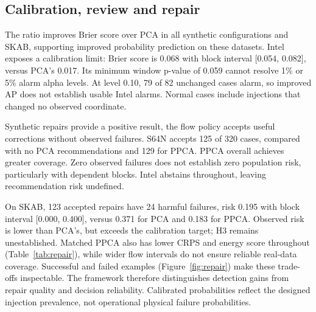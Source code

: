 \documentclass{llncs}
\newcommand{\1}{\mathbf{1}}
\begin{document}
\subsection{Calibration, review and repair}
The ratio improves Brier score over PCA in all synthetic configurations and SKAB, supporting improved probability prediction on these datasets. Intel exposes a calibration limit: Brier score is 0.068 with block interval [0.054, 0.082], versus PCA's 0.017. Its minimum window p-value of 0.059 cannot resolve 1\% or 5\% alarm alpha levels. At level 0.10, 79 of 82 unchanged cases alarm, so improved AP does not establish usable Intel alarms. Normal cases include injections that changed no observed coordinate.

Synthetic repairs provide a positive result, the flow policy accepts useful corrections without observed failures. S64N accepts 125 of 320 cases, compared with no PCA recommendations and 129 for PPCA. PPCA overall achieves greater coverage. Zero observed failures does not establish zero population risk, particularly with dependent blocks. Intel abstains throughout, leaving recommendation risk undefined.

On SKAB, 123 accepted repairs have 24 harmful failures, risk 0.195 with block interval [0.000, 0.400], versus 0.371 for PCA and 0.183 for PPCA. Observed risk is lower than PCA's, but exceeds the calibration target; H3 remains unestablished. Matched PPCA also has lower CRPS and energy score throughout (Table~\ref{tab:repair}), while wider flow intervals do not ensure reliable real-data coverage. Successful and failed examples (Figure~\ref{fig:repair}) make these trade-offs inspectable. The framework therefore distinguishes detection gains from repair quality and decision reliability. Calibrated probabilities reflect the designed injection prevalence, not operational physical failure probabilities.
\end{document}
